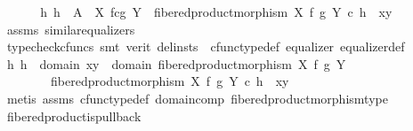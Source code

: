 \begin{isabellebody}
\ \ \isamarkupfalse%
\ \isamarkupfalse%
\ {\isachardoublequoteopen}{\isasymexists}{\isacharbang}{\kern0pt}\ h{\isachardot}{\kern0pt}\ h\ {\isacharcolon}{\kern0pt}\ A\ {\isasymrightarrow}\ X\ \isactrlbsub f\isactrlesub {\isasymtimes}\isactrlsub c\isactrlbsub g\isactrlesub \ Y\ {\isasymand}\ fibered{\isacharunderscore}{\kern0pt}product{\isacharunderscore}{\kern0pt}morphism\ X\ f\ g\ Y\ {\isasymcirc}\isactrlsub c\ h\ {\isacharequal}{\kern0pt}\ {\isasymlangle}x{\isacharcomma}{\kern0pt}y{\isasymrangle}{\isachardoublequoteclose}\isanewline
\ \ \ \ \isamarkupfalse%
\ assms\ similar{\isacharunderscore}{\kern0pt}equalizers\ \isamarkupfalse%
\ {\isacharparenleft}{\kern0pt}typecheck{\isacharunderscore}{\kern0pt}cfuncs{\isacharcomma}{\kern0pt}\ smt\ {\isacharparenleft}{\kern0pt}verit{\isacharcomma}{\kern0pt}\ del{\isacharunderscore}{\kern0pt}insts{\isacharparenright}{\kern0pt}\ \ cfunc{\isacharunderscore}{\kern0pt}type{\isacharunderscore}{\kern0pt}def\ equalizer\ equalizer{\isacharunderscore}{\kern0pt}def{\isacharparenright}{\kern0pt}\isanewline
\ \ \isamarkupfalse%
\ \isamarkupfalse%
\ {\isachardoublequoteopen}{\isasymexists}h{\isachardot}{\kern0pt}\ h\ {\isacharcolon}{\kern0pt}\ domain\ {\isasymlangle}x{\isacharcomma}{\kern0pt}y{\isasymrangle}\ {\isasymrightarrow}\ domain\ {\isacharparenleft}{\kern0pt}fibered{\isacharunderscore}{\kern0pt}product{\isacharunderscore}{\kern0pt}morphism\ X\ f\ g\ Y{\isacharparenright}{\kern0pt}\ {\isasymand}\isanewline
\ \ \ \ \ \ \ \ fibered{\isacharunderscore}{\kern0pt}product{\isacharunderscore}{\kern0pt}morphism\ X\ f\ g\ Y\ {\isasymcirc}\isactrlsub c\ h\ {\isacharequal}{\kern0pt}\ {\isasymlangle}x{\isacharcomma}{\kern0pt}y{\isasymrangle}{\isachardoublequoteclose}\isanewline
\ \ \ \ \isamarkupfalse%
\ {\isacharparenleft}{\kern0pt}metis\ assms{\isacharparenleft}{\kern0pt}{}{\isacharcomma}{\kern0pt}{}{\isacharparenright}{\kern0pt}\ cfunc{\isacharunderscore}{\kern0pt}type{\isacharunderscore}{\kern0pt}def\ domain{\isacharunderscore}{\kern0pt}comp\ fibered{\isacharunderscore}{\kern0pt}product{\isacharunderscore}{\kern0pt}morphism{\isacharunderscore}{\kern0pt}type{\isacharparenright}{\kern0pt}\isanewline
{}\isamarkupfalse%
%
\endisatagproof
{\isafoldproof}%
%
\isadelimproof
\isanewline
%
\endisadelimproof
\isanewline
{}\isamarkupfalse%
\ fibered{\isacharunderscore}{\kern0pt}product{\isacharunderscore}{\kern0pt}is{\isacharunderscore}{\kern0pt}pullback{\isacharcolon}{\kern0pt}\isanewline

\end{isabellebody}
